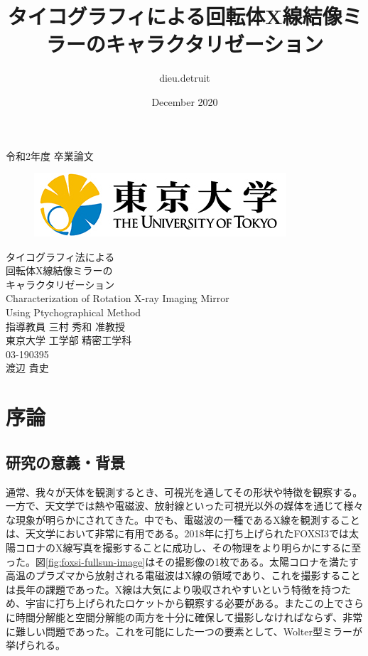 \documentclass[dvipdfmx,autodetect-engine]{jreport}
\title{タイコグラフィによる回転体X線結像ミラーのキャラクタリゼーション}
\author{dieu.detruit }
\date{December 2020}
\begin{document}
\begin{center}
\thispagestyle{empty}
{\LARGE 令和2年度 卒業論文}\\
\begin{figure}[H]
    \centering
    \includegraphics[scale=0.4]{images/utility/utlogo.jpg}
\end{figure}
\vspace*{2.5cm}
{\Huge タイコグラフィ法による}\\
\vspace*{0.5cm}
{\Huge 回転体X線結像ミラーの}\\
\vspace*{0.5cm}
{\Huge キャラクタリゼーション}\\
\vspace*{1.5cm}
{\huge Characterization of Rotation X-ray Imaging Mirror}\\
\vspace*{0.5cm}
{\huge Using Ptychographical Method}\\
\vspace*{3.5cm}
{\LARGE 指導教員 三村 秀和 准教授}\\
\vspace*{1.0cm}
{\Large 東京大学 工学部 精密工学科}\\
{\Large 03-190395}\\
\vspace*{1.0cm}
{\LARGE 渡辺 貴史}
\end{center}

\newpage
\tableofcontents

\newpage
\chapter{序論}
\section{研究の意義・背景}
通常、我々が天体を観測するとき、可視光を通してその形状や特徴を観察する。一方で、天文学では熱や電磁波、放射線といった可視光以外の媒体を通じて様々な現象が明らかにされてきた。中でも、電磁波の一種であるX線を観測することは、天文学において非常に有用である。2018年に打ち上げられたFOXSI3では太陽コロナのX線写真を撮影することに成功し、その物理をより明らかにするに至った。図\ref{fig:foxsi-fullsun-image}はその撮影像の1枚である。太陽コロナを満たす高温のプラズマから放射される電磁波はX線の領域であり、これを撮影することは長年の課題であった。X線は大気により吸収されやすいという特徴を持つため、宇宙に打ち上げられたロケットから観察する必要がある。またこの上でさらに時間分解能と空間分解能の両方を十分に確保して撮影しなければならず、非常に難しい問題であった。これを可能にした一つの要素として、Wolter型ミラーが挙げられる。
\end{document}
